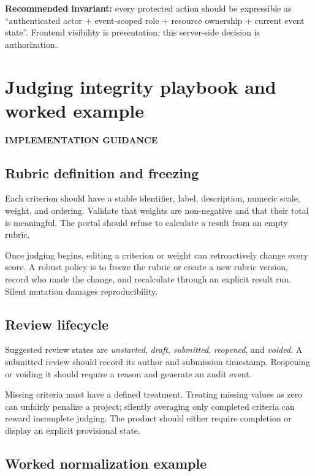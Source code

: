 \documentclass[11pt]{article}
\newcommand{\advisory}{\textcolor{DeepBlue}{\textbf{IMPLEMENTATION GUIDANCE}}}
\begin{document}
\begin{keybox}
\textbf{Recommended invariant:} every protected action should be expressible as ``authenticated actor + event-scoped role + resource ownership + current event state''. Frontend visibility is presentation; this server-side decision is authorization.
\end{keybox}

\section{Judging integrity playbook and worked example}

\advisory\par


\subsection{Rubric definition and freezing}

Each criterion should have a stable identifier, label, description, numeric scale, weight, and ordering. Validate that weights are non-negative and that their total is meaningful. The portal should refuse to calculate a result from an empty rubric.

Once judging begins, editing a criterion or weight can retroactively change every score. A robust policy is to freeze the rubric or create a new rubric version, record who made the change, and recalculate through an explicit result run. Silent mutation damages reproducibility.

\subsection{Review lifecycle}

Suggested review states are \emph{unstarted}, \emph{draft}, \emph{submitted}, \emph{reopened}, and \emph{voided}. A submitted review should record its author and submission timestamp. Reopening or voiding it should require a reason and generate an audit event.

Missing criteria must have a defined treatment. Treating missing values as zero can unfairly penalize a project; silently averaging only completed criteria can reward incomplete judging. The product should either require completion or display an explicit provisional state.

\subsection{Worked normalization example}
\end{document}
